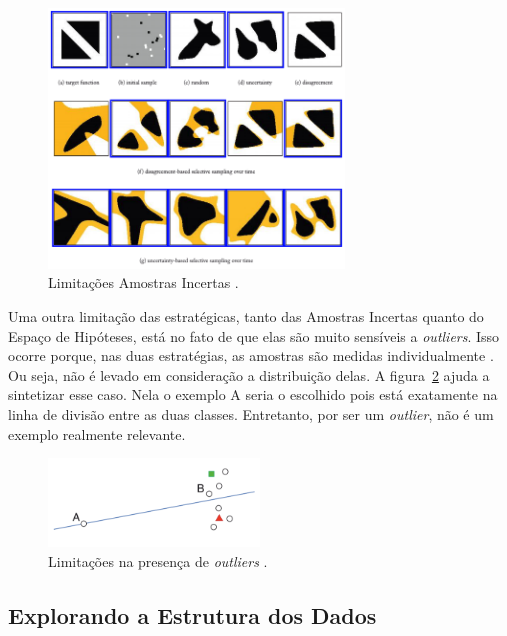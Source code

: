 \begin{figure}
  \centering
  \includegraphics[width=0.7\textwidth]{figures/limitations_incertas.png}
  \caption{Limitações Amostras Incertas \citep{settles2014active}.}
  \label{fig:limitations_incertas}
\end{figure}

Uma outra limitação das estratégicas, tanto das Amostras Incertas quanto do Espaço de Hipóteses, está no fato de que elas são muito sensíveis a \emph{outliers}. Isso ocorre porque, nas duas estratégias, as amostras são medidas individualmente \citep{settles2014active}. Ou seja, não é levado em consideração a distribuição delas. A figura~\ref{fig:limitations_outliers} ajuda a sintetizar esse caso. Nela o exemplo A seria o escolhido pois está exatamente na linha de divisão entre as duas classes. Entretanto, por ser um \emph{outlier}, não é um exemplo realmente relevante. 


\begin{figure}
  \centering
  \includegraphics[width=0.5\textwidth]{figures/limitations_outliers.png}
  \caption{Limitações na presença de \emph{outliers} \citep{settles2014active}.}
  \label{fig:limitations_outliers}
\end{figure}


\subsection{Explorando a Estrutura dos Dados} 
\label{sec:explorando_estrutura_dados }

